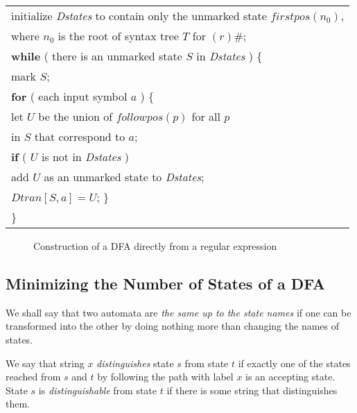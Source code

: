 \documentclass[a4paper,twoside]{book}
\begin{document}
\begin{center}
    \begin{tabular}{l}
        initialize \textit{Dstates} to contain only the unmarked state $firstpos(n_0)$,\\
        \qquad where $n_0$ is the root of syntax tree $T$ for $(r)\#$;\\
        \textbf{while} ( there is an unmarked state $S$ in \textit{Dstates} ) \{\\
        \qquad mark $S$;\\
        \qquad\textbf{for} ( each input symbol $a$ ) \{\\
        \qquad\qquad let $U$ be the union of $followpos(p)$ for all $p$\\
        \qquad\qquad\qquad in $S$ that correspond to $a$;\\
        \qquad\qquad\textbf{if} ( $U$ is not in \textit{Dstates} )\\
        \qquad\qquad\qquad add $U$ as an unmarked state to \textit{Dstates};\\
        \qquad\qquad$Dtran[S,a]=U$;
        \qquad\}\\
        \}
    \end{tabular}
\end{center}
\begin{figure}[htbp]
    \caption{Construction of a DFA directly from a regular expression}
    \label{Figure:3.62}
\end{figure}

\subsection{Minimizing the Number of States of a DFA}

We shall say that two automata are \textit{the same up to the state names} if one can be transformed into the other by doing nothing more than changing the names of states.

We say that string $x$ \textit{distinguishes} state $s$ from state $t$ if exactly one of the states reached from $s$ and $t$ by following the path with label $x$ is an accepting state. State $s$ is \textit{distinguishable} from state $t$ if there is some string that distinguishes them.
\end{document}
